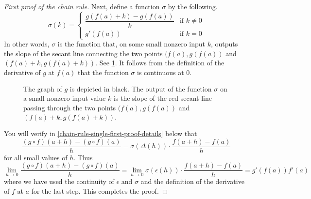 \begin{proof}[First proof of the chain rule]
	Next, define a function $\sigma$ by the following.  
	\[ \sigma(k) = \begin{cases} \dfrac{g(f(a)+k) - g(f(a))}{k} & \text{if } k \neq 0 \\ g'(f(a)) & \text{if } k = 0 \end{cases} \]
	In other words, $\sigma$ is the function that, on some small nonzero input $k$, outputs the slope of the secant line connecting the two points $(f(a), g(f(a))$ and $(f(a)+k, g(f(a)+k))$. See \cref{slope-function-chain-rule}. It follows from the definition of the derivative of $g$ at $f(a)$ that the function $\sigma$ is continuous at 0. 
	
	\begin{figure}[t]
		\begin{center}
		\end{center}
		\caption{The graph of $g$ is depicted in black. The output of the function $\sigma$ on a small nonzero input value $k$ is the slope of the red secant line passing through the two points $(f(a), g(f(a))$ and $(f(a)+k, g(f(a)+k))$. }  \label{slope-function-chain-rule}
	\end{figure}
	
	
	You will verify in \cref{chain-rule-single-first-proof-details} below that
	\begin{equation} \label{alternative-to-multiplicative-cross-term} \frac{(g \circ f)(a+h) - (g \circ f)(a)}{h} = \sigma(\Delta(h)) \cdot \frac{f(a+h)-f(a)}{h} \end{equation}
	for all small values of $h$. Thus
	\[ \lim_{h \to 0} \frac{(g \circ f)(a+h) - (g \circ f)(a)}{h} = \lim_{h \to 0} \sigma (\epsilon(h)) \cdot \frac{f(a+h)-f(a)}{h} = g'(f(a)) f'(a) \]
	where we have used the continuity of $\epsilon$ and $\sigma$ and the definition of the derivative of $f$ at $a$ for the last step. This completes the proof. 
\end{proof}
	
